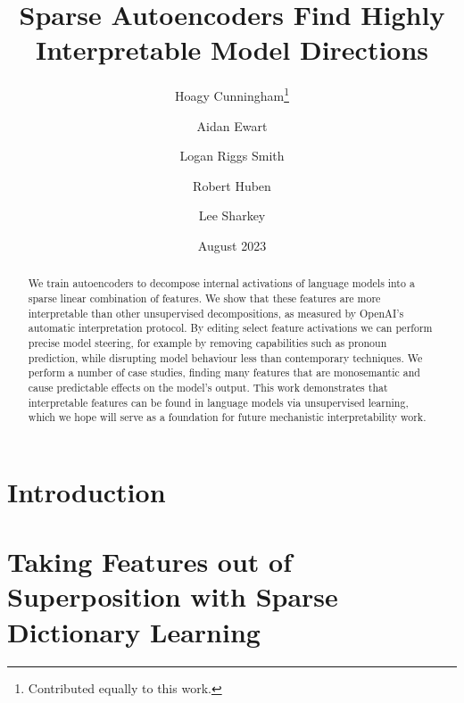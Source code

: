 \documentclass[12pt]{article}
\title{Sparse Autoencoders Find Highly Interpretable Model Directions}
\author[1,2]{Hoagy Cunningham\thanks{Contributed equally to this work.}}
\author[1,*]{Aidan Ewart}
\author[1,*]{Logan Riggs Smith}
\author[1]{Robert Huben}
\author[3]{Lee Sharkey}
\affil[1]{EleutherAI}
\affil[2]{SERI MATS}
\affil[3]{Apollo Research}
\date{August 2023}
\begin{document}
\maketitle
\begin{abstract}
    We train autoencoders to decompose internal activations of language models into a sparse linear combination of features. We show that these features are more interpretable than other unsupervised decompositions, as measured by OpenAI's automatic interpretation protocol. By editing select feature activations we can perform precise model steering, for example by removing capabilities such as pronoun prediction, while disrupting model behaviour less than contemporary techniques. We perform a number of case studies, finding many features that are monosemantic and cause predictable effects on the model's output. This work demonstrates that interpretable features can be found in language models via unsupervised learning, which we hope will serve as a foundation for future mechanistic interpretability work.
    
\end{abstract}


\section{Introduction}



\section{Taking Features out of Superposition with Sparse Dictionary Learning}

\end{document}

